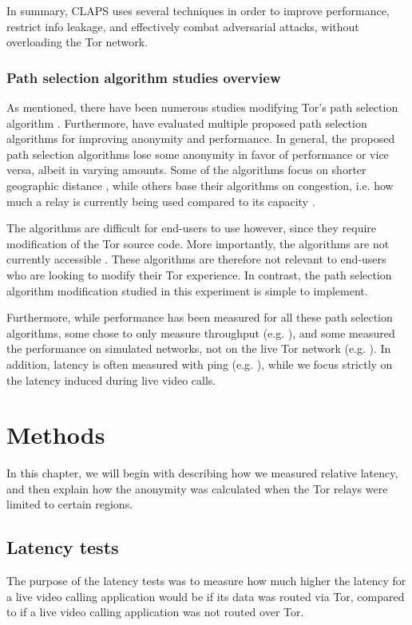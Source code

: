 \documentclass{kththesis}
\begin{document}
In summary, CLAPS uses several techniques in order to improve performance, restrict info leakage, and effectively combat adversarial attacks, without overloading the Tor network.

\subsection{Path selection algorithm studies overview}
As mentioned, there have been numerous studies modifying Tor's path selection algorithm \parencite{CLAPS}\parencite{LASTor}\parencite{5684020}\parencite{1866345}\parencite{wang2012congestion}. Furthermore, \textcite{wacek2013empirical} have evaluated multiple proposed path selection algorithms for improving anonymity and performance. In general, the proposed path selection algorithms lose some anonymity in favor of performance or vice versa, albeit in varying amounts. Some of the algorithms focus on shorter geographic distance \parencite{LASTor}, while others base their algorithms on congestion, i.e. how much a relay is currently being used compared to its capacity \parencite{wang2012congestion}.

The algorithms are difficult for end-users to use however, since they require modification of the Tor source code. More importantly, the algorithms are not currently accessible \parencite{CLAPSgithub}. These algorithms are therefore not relevant to end-users who are looking to modify their Tor experience. In contrast, the path selection algorithm modification studied in this experiment is simple to implement.

Furthermore, while performance has been measured for all these path selection algorithms, some chose to only measure throughput (e.g. \textcite{5684020}), and some measured the performance on simulated networks, not on the live Tor network (e.g. \textcite{CLAPS}). In addition, latency is often measured with ping (e.g. \textcite{wacek2013empirical}), while we focus strictly on the latency induced during live video calls.

\chapter{Methods}
In this chapter, we will begin with describing how we measured relative latency, and then explain how the anonymity was calculated when the Tor relays were limited to certain regions.

\section{Latency tests}
The purpose of the latency tests was to measure how much higher the latency for a live video calling application would be if its data was routed via Tor, compared to if a live video calling application was not routed over Tor.
\end{document}
